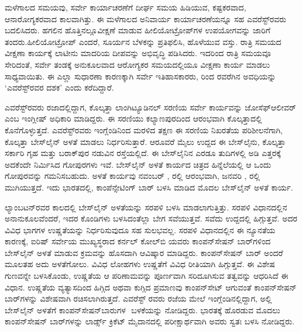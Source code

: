 ಮಳೆಗಾಲದ ಸಮಯವು, ಸರ್ವೇ ಕಾರ್ಯಾಚರಣೆಗೆ ದೀರ್ಘ ಸಮಯ ಹಿಡಿಯುವ, ಕಷ್ಟಕರವಾದ, ಆನಾರೋಗ್ಯಕರವಾದ ಕಾಲವಾಗಿತ್ತು. ಈ ಮಳೆಗಾಲದ ಅನಿವಾರ್ಯ ಕಾರ್ಯಾಚರಣೆಯನ್ನೂ ಸಹ ಎವರೆಸ್ಟ್​ರವರು ಬದಲಿಸಿದರು. ಹಗಲಿನ ಹೊತ್ತಿನಲ್ಲೂ\break ವೀಕ್ಷಣೆ ಮಾಡುವ ಹೀಲಿಯೋಟ್ರೋಪ್​ಗಳ ಉಪಯೋಗವನ್ನು ಜಾರಿಗೆ ತಂದರು.\break ಹೀಲಿಯೋಟ್ರೋಪ್​ ಎಂದರೆ, ಸೂರ್ಯನ ಬೆಳಕನ್ನು ಪ್ರತಿಫಲಿಸಿ, ಹೊಳೆಯುವ ವಸ್ತು. ರಾತ್ರಿ ಸಮಯದ ವೀಕ್ಷಣಾ ಕಾರ್ಯಕ್ಕೆ ಲಾಟೀನು ಮಾದರಿಯ ದೀಪವನ್ನು ಅಭಿವೃದ್ಧಿ ಪಡಿಸಿದರು. ಇದರಿಂದ ರಾತ್ರಿ ಸಮಯವೂ ಸೇರಿದಂತೆ, ಸರ್ವೇ ತಂಡಕ್ಕೆ ಅನುಕೂಲವಾದ ಆರೋಗ್ಯಕರ ಸಮಯದಲ್ಲಿಯೂ ವೀಕ್ಷಣಾ ಕಾರ್ಯ ಮಾಡಲು ಸಾಧ್ಯವಾಯಿತು. ಈ ಎಲ್ಲಾ ಸುಧಾರಣಾ ಕಾರಣಕ್ಕಾಗಿ ಸರ್ವೇ ಇತಿಹಾಸಕಾರರು,  ರಿಂದ  ರವರೆಗಿನ ಅವಧಿಯನ್ನು ‘ಎವರೆಸ್ಟ್​ರವರ ದಶಕ’ ಎಂದು ಕರೆದಿದ್ದಾರೆ.

ಎವರೆಸ್ಟ್​ರವರು ರಜಾದಲ್ಲಿದ್ದಾಗ, ಕೊಲ್ಕತ್ತಾ ಲಾಂಗಿಟ್ಯೂಡಿನಲ್​ ಸರಣಿಯ ಸರ್ವೇ ಕಾರ್ಯವನ್ನು ಜೋಸೆಫ್​ ಆಲೀವರ್​ ಎಂಬ ಇಂಗ್ಲೀಷ್​ ಅಧಿಕಾರಿ ಮಾಡಿದ್ದರು. ಈ ಸರಣಿಯು ಕಲ್ಯಾಣಪುರದಿಂದ ಆರಂಭವಾಗಿ ಕೊಲ್ಕತ್ತಾದಲ್ಲಿ ಕೊನೆಗೊಳ್ಳುತ್ತದೆ. ಎವರೆಸ್ಟ್​ರವರು ಇಂಗ್ಲೆಂಡಿನಿಂದ ಮರಳಿದ ತಕ್ಷಣ ಈ ಸರಣಿಯ ನಿಖರತೆಯ ಪರಿಶೀಲನೆಗಾಗಿ, ಕೊಲ್ಕತ್ತಾ ಬೇಸ್‌ಲೈನ್​ ಅಳತೆ ಮಾಡಲು ನಿರ್ಧರಿಸುತ್ತಾರೆ. ಆರೂವರೆ ಮೈಲು ಉದ್ದದ ಈ ಬೇಸ್​ಲೈನು, ಕೊಲ್ಕತ್ತಾ ಸರ್ಕಾರಿ ಗೃಹ ಮತ್ತು ಬರಾಕ್​ಪುರ ನಡುವಿನ ರಸ್ತೆಯಲ್ಲಿದೆ. ಈ ಬೇಸ್​ಲೈನಿನ ಎರಡೂ ತುದಿಗಳಲ್ಲಿ  ಅಡಿ ಎತ್ತರಕ್ಕೆ ಅದಕೆಂದೇ ನಿರ್ಮಿಸಿದ ಗೋಪುರಗಳು ಇವೆ. ಬೇಸ್‌ಲೈನ್ ಅಳತೆ ಕಾರ್ಯದ ಚಿತ್ರದ ಹಿನ್ನೆಲೆಯಲ್ಲಿ ಆ ಒಂದು ಗೋಪುರವನ್ನು ಗಮನಿಸಬಹುದು. ಅಳತೆ ಕಾರ್ಯವು ನವಂಬರ್​ ,  ರಲ್ಲಿ ಆರಂಭವಾಗಿ, ಜನವರಿ ,  ರಲ್ಲಿ ಮುಗಿಯುತ್ತದೆ. ಇದು ಭಾರತದಲ್ಲಿ, ಕಾಂಪೆನ್ಸೇಟಿಂಗ್​ ಬಾರ್​ ಬಳಸಿ ಮಾಡಿದ ಮೊದಲ ಬೇಸ್‌ಲೈನ್​ ಅಳತೆ ಕಾರ್ಯ.

ಲ್ಯಾಂಬಟನ್​ರವರ ಕಾಲದಲ್ಲಿ ಬೇಸ್‌ಲೈನ್​ ಅಳತೆಯನ್ನು ಸರಪಳಿ ಬಳಸಿ ಮಾಡಲಾಗುತ್ತಿತ್ತು. ಸರಪಳಿ ವಿಧಾನದಲ್ಲಿನ ಅನಾನುಕೂಲವೆಂದರೆ, ಇದರ ಕೊಂಡಿಗಳು ಬಳಸಿದಂತೆಲ್ಲಾ ಬೇಗ ಸವೆಯುತ್ತವೆ. ಸವೆದು ಉದ್ದದಲ್ಲಿ ಹಿಗ್ಗುತ್ತವೆ. ಅದರ ವಿವಿಧ ಭಾಗಗಳ ಉಷ್ಣತೆಯನ್ನು ನಿರ್ಧರಿಸುವುದೂ ಸಹ ಸುಲಭವಲ್ಲ. ಸರಪಳಿ ವಿಧಾನದಲ್ಲಿನ ಈ ನ್ಯೂನತೆಯ ಕಾರಣಕ್ಕೆ, ಐರಿಷ್​ ಸರ್ವೇಯ ಮುಖ್ಯಸ್ಥರಾದ ಕರ್ನಲ್​ ಕೋಲ್​ಬಿ ಯವರು ಕಾಂಪನ್​ಸೇಷನ್​ ಬಾರ್​ಗಳಿಂದ ಬೇಸ್‌ಲೈನ್​ ಅಳತೆ ಮಾಡುವ ಕ್ರಮವನ್ನು ಹೊಸದಾಗಿ ಆವಿಷ್ಕಾರ ಮಾಡಿದ್ದರು. ಕಾಂಪನ್​ಸೇಷನ್​ ಬಾರ್​ ಅಂದರೆ ಮೂಲತಹ ಅದು ಅಳತೆಗೋಲು. ವಿವಿಧ ಲೋಹಗಳು ಉಷ್ಣತೆಗೆ ವಿವಿಧ ರೀತಿಯಾಗಿ ಹಿಗ್ಗುತ್ತವೆ. ಈ ವಿಶೇಷ ಗುಣವನ್ನೇ ಬಳಸಿಕೊಂಡು, ಉಷ್ಣತೆಯ ಆ ಪರಿಣಾಮವನ್ನು ಪೂರ್ಣವಾಗಿ ಸರಿದೂಗಿಸುವ ತತ್ವವನ್ನು ಆಧರಿಸಿದೆ ಈ ವಿಧಾನ. ಉಷ್ಣತೆಯ ವ್ಯತ್ಯಾಸದಿಂದ ಹಿಗ್ಗಿದ ಅಥವಾ ಕುಗ್ಗಿದ ಪ್ರಮಾಣವು ಕಾಂಪನ್​ಸೇಟ್​ ಆಗುವಂತೆ ಕಾಂಪನ್​ಸೇಷನ್​ ಬಾರ್​ಗಳನ್ನು ವಿಶೇಷವಾಗಿ ರಚಿಸಲಾಗಿರುತ್ತದೆ. ಎವರೆಸ್ಟ್​ ರವರು ರಜೆಯ ಮೇಲೆ ಇಂಗ್ಲೆಂಡಿನಲ್ಲಿದ್ದಾಗ, ಅಲ್ಲಿ ಬೇಸ್‌ಲೈನ್​ ಅಳತೆಗೆ ಕಾಂಪನ್​ಸೇಷನ್​ ಬಾರುಗಳ ​ ಬಳಕೆಯನ್ನು ನೋಡಿದ್ದರು. ಭಾರತಕ್ಕೆ ಹೊರಡುವ ಮೊದಲು ಕಾಂಪನ್​ಸೇಷನ್​ ಬಾರ್​ಗಳನ್ನು ಲಾರ್ಡ್ಸ್ ಕ್ರಿಕೆಟ್​ ಮೈದಾನದಲ್ಲಿ ಪರೀಕ್ಷಾರ್ಥವಾಗಿ ಅವರು ಸ್ವತಃ ಬಳಸಿ ನೋಡಿದ್ದರು.

\newpage

